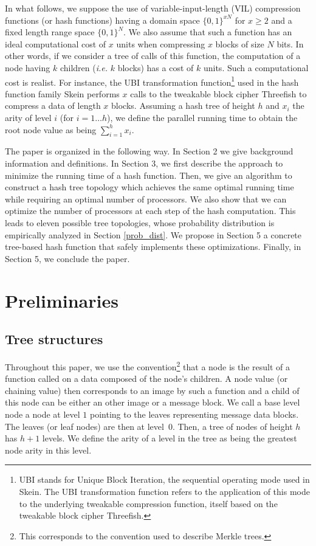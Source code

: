\documentclass{llncs}
\begin{document}
In what follows, we suppose the use of variable-input-length (VIL) compression functions (or hash functions)
having a domain space $\{0,1\}^{xN}$  for $x \geq 2$ and a fixed length range space $\{0,1\}^N$.
We also assume that such a function has an ideal computational cost of $x$ units when compressing $x$ blocks of size $N$ bits.
In other words, if we consider a tree of calls of
this function, the computation of a node having $k$ children (\emph{i.e.} $k$ blocks) has a cost of $k$ units.
Such a computational cost is realist. For instance, the UBI transformation function\footnote{UBI stands for Unique Block Iteration, the 
sequential operating mode used in Skein. The UBI transformation function refers to the application of this mode to the underlying tweakable
compression function, itself based on the tweakable block cipher Threefish.
}
used in the hash function family Skein \cite{FLSWBKCW09} performs $x$ calls to the tweakable block cipher Threefish
to compress a data of length $x$ blocks. Assuming a hash tree of height $h$ and $x_i$ the arity of level $i$ (for $i=1 \ldots h$), we define the parallel 
running time to obtain the root node value as being $\sum_{i=1}^h x_i$.

The paper is organized in the following way. In Section 2 we give background information and definitions.
In Section 3, we first describe the approach to minimize the running time of a hash function. Then, we give an algorithm to
construct a hash tree topology which achieves the same optimal running time while requiring an optimal number of processors.
We also show that we can optimize the number of processors at each step of the hash computation. This leads to eleven possible
tree topologies, whose probability distribution is empirically analyzed in Section \ref{prob_dist}.
We propose in Section 5
a concrete tree-based hash function that safely implements these optimizations.
Finally, in Section 5,  we conclude the paper. 

\section{Preliminaries}\label{subsec:backg}

\subsection{Tree structures}


Throughout this paper, 
we use the 
convention\footnote{This corresponds to the convention used to describe Merkle trees. 
} that a node is the result of
a function called on a data composed of the node's children.
A node value (or chaining value) then corresponds to an image by such a function and a child of this node can be either
an other image or a message block.
We call a base level node a node at level $1$ pointing to the leaves representing message data blocks. The leaves (or leaf nodes) 
are then at level~$0$. Then, a tree of nodes of height $h$ has $h+1$ levels.
We define the arity of a level in the tree as being the greatest node arity in this level.
\end{document}
